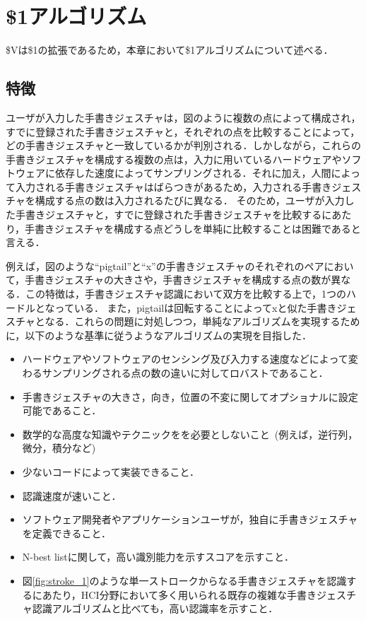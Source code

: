 \chapter{\$1アルゴリズム}
\$Vは\$1の拡張であるため，本章において\$1アルゴリズムについて述べる．

\section{特徴}
ユーザが入力した手書きジェスチャは，図のように複数の点によって構成され，すでに登録された手書きジェスチャと，それぞれの点を比較することによって，どの手書きジェスチャと一致しているかが判別される．しかしながら，これらの手書きジェスチャを構成する複数の点は，入力に用いているハードウェアやソフトウェアに依存した速度によってサンプリングされる．それに加え，人間によって入力される手書きジェスチャはばらつきがあるため，入力される手書きジェスチャを構成する点の数は入力されるたびに異なる．
そのため，ユーザが入力した手書きジェスチャと，すでに登録された手書きジェスチャを比較するにあたり，手書きジェスチャを構成する点どうしを単純に比較することは困難であると言える．


例えば，図のような``pigtail''と``x''の手書きジェスチャのそれぞれのペアにおいて，手書きジェスチャの大きさや，手書きジェスチャを構成する点の数が異なる．この特徴は，手書きジェスチャ認識において双方を比較する上で，1つのハードルとなっている．
また，pigtailは回転することによってxと似た手書きジェスチャとなる．これらの問題に対処しつつ，単純なアルゴリズムを実現するために，以下のような基準に従うようなアルゴリズムの実現を目指した．

\begin{itemize}
\item ハードウェアやソフトウェアのセンシング及び入力する速度などによって変わるサンプリングされる点の数の違いに対してロバストであること．
\item 手書きジェスチャの大きさ，向き，位置の不変に関してオプショナルに設定可能であること．
\item 数学的な高度な知識やテクニックをを必要としないこと~(例えば，逆行列，微分，積分など)
\item 少ないコードによって実装できること．
\item 認識速度が速いこと．
\item ソフトウェア開発者やアプリケーションユーザが，独自に手書きジェスチャを定義できること．
\item N-best listに関して，高い識別能力を示すスコアを示すこと．
\item 図\ref{fig:stroke_1}のような単一ストロークからなる手書きジェスチャを認識するにあたり，HCI分野において多く用いられる既存の複雑な手書きジェスチャ認識アルゴリズムと比べても，高い認識率を示すこと．
\end{itemize}


